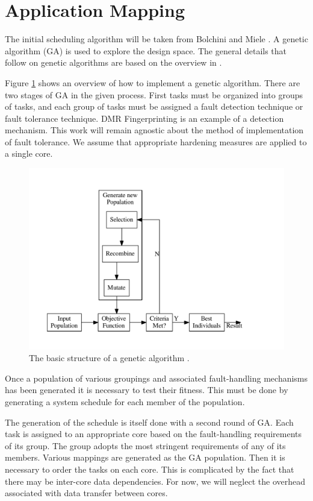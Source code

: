 \documentclass[table,11pt]{article}
\begin{document}
\section{Application Mapping}

The initial scheduling algorithm will be taken from Bolchini and  Miele \cite{bolchini2013reliability}. A genetic algorithm (GA) is used to explore the design space. The general details that follow on genetic algorithms are based on the overview in \cite{geatbx}.

Figure \ref{f:ga_ov} shows an overview of how to implement a genetic algorithm. There are two stages of GA in the given process. First tasks must be organized into groups of tasks, and each group of tasks must be assigned a fault detection technique or fault tolerance technique. DMR Fingerprinting is an example of a detection mechanism. This work will remain agnostic about the method of implementation of fault tolerance. We assume that appropriate hardening measures are applied to a single core.
 
\begin{figure}[h]
\centering
\includegraphics[width=12cm]{figures/ga_ov}
\caption{The basic structure of a genetic algorithm \cite{geatbx}.}
\label{f:ga_ov}
\end{figure}

Once a population of various groupings and associated fault-handling mechanisms has been generated it is necessary to test their fitness. This must be done by generating a system schedule for each member of the population. 

The generation of the schedule is itself done with a second round of GA. Each task is assigned to an appropriate core based on the fault-handling requirements of its group. The group adopts the most stringent requirements of any of its members. Various mappings are generated as the GA population. Then it is necessary to order the tasks on each core. This is complicated by the fact that there may be inter-core data dependencies. For now, we will neglect the overhead associated with data transfer between cores.
\end{document}
